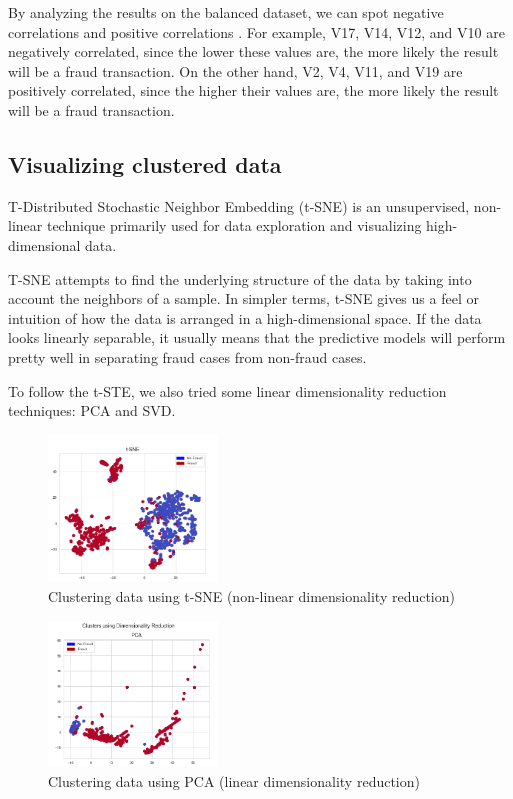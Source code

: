 \documentclass[conference]{IEEEtran}
\begin{document}
By analyzing the results on the balanced dataset, we can spot negative correlations and positive correlations \cite{paper_dealing_with_imbalanced}.
For example, V17, V14, V12, and V10 are negatively correlated, since the lower these values are, the more likely the result will be a fraud transaction. On the other hand, V2, V4, V11, and V19 are positively correlated, since the higher their values are, the more likely the result will be a fraud transaction.

\subsection{Visualizing clustered data}

T-Distributed Stochastic Neighbor Embedding (t-SNE) is an unsupervised, non-linear technique primarily used for data exploration and visualizing high-dimensional data.

T-SNE attempts to find the underlying structure of the data by taking into account the neighbors of a sample.
In simpler terms, t-SNE gives us a feel or intuition of how the data is arranged in a high-dimensional space. If the data looks linearly separable, it usually means that the predictive models will perform pretty well in separating fraud cases from non-fraud cases.

To follow the t-STE, we also tried some linear dimensionality reduction techniques: PCA and SVD.

\begin{figure}[H]
    \centering\includegraphics[width=0.4\textwidth]{images/clustering _tsne.png}
    \caption{Clustering data using t-SNE (non-linear dimensionality reduction)}
    \label{fig:example}
\end{figure}

\begin{figure}[H]
        \centering\includegraphics[width=0.4\textwidth]{images/clustering_pca.png}
    \caption{Clustering data using PCA (linear dimensionality reduction)}
    \label{fig:example}
\end{figure}
\end{document}

